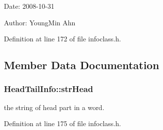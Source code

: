 \begin{Desc}
\item[Date:]2008-10-31 \end{Desc}
\begin{Desc}
\item[Author:]YoungMin Ahn \end{Desc}


Definition at line 172 of file infoclass.h.

\subsection{Member Data Documentation}
\hypertarget{classHeadTailInfo_ba8041dd8d510cda99e7bb5ef781c095}{
\subsubsection[{strHead}]{ {\bf HeadTailInfo::strHead}}}
\label{classHeadTailInfo_ba8041dd8d510cda99e7bb5ef781c095}


the string of head part in a word. 



Definition at line 175 of file infoclass.h.

